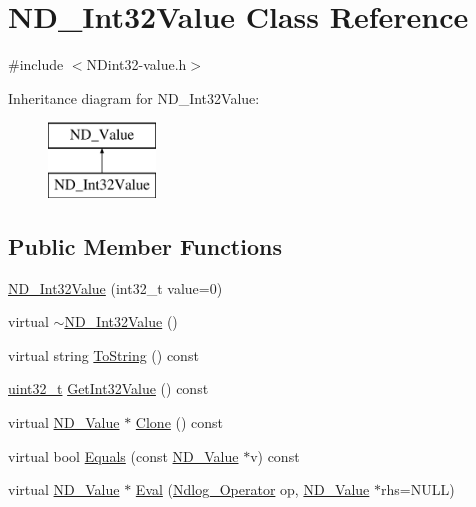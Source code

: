\hypertarget{class_n_d___int32_value}{\section{N\-D\-\_\-\-Int32\-Value Class Reference}
\label{class_n_d___int32_value}
}


{\ttfamily \#include $<$N\-Dint32-\/value.\-h$>$}

Inheritance diagram for N\-D\-\_\-\-Int32\-Value\-:\begin{figure}[H]
\begin{center}
\leavevmode
\includegraphics[height=2.000000cm]{class_n_d___int32_value}
\end{center}
\end{figure}
\subsection*{Public Member Functions}
\begin{DoxyCompactItemize}
\item 
\hyperlink{class_n_d___int32_value_aa1be1030824a1e3b2de45f15ca7e89ef}{N\-D\-\_\-\-Int32\-Value} (int32\-\_\-t value=0)
\item 
virtual \hyperlink{class_n_d___int32_value_a6a558abd1d2fd0fc446f5190ba7fc0d3}{$\sim$\-N\-D\-\_\-\-Int32\-Value} ()
\item 
virtual string \hyperlink{class_n_d___int32_value_a897c234f7b6f00843c2d9d103956b2ae}{To\-String} () const 
\item 
\hyperlink{msus_2webserver_2uthash_8h_a435d1572bf3f880d55459d9805097f62}{uint32\-\_\-t} \hyperlink{class_n_d___int32_value_a41cb60b42991e7f1ca03f732fda09aaf}{Get\-Int32\-Value} () const 
\item 
virtual \hyperlink{class_n_d___value}{N\-D\-\_\-\-Value} $\ast$ \hyperlink{class_n_d___int32_value_ae8fc6254509ce906a191e45c06f49658}{Clone} () const 
\item 
virtual bool \hyperlink{class_n_d___int32_value_af66a16bf770c3fd847d4af6c624b1860}{Equals} (const \hyperlink{class_n_d___value}{N\-D\-\_\-\-Value} $\ast$v) const 
\item 
virtual \hyperlink{class_n_d___value}{N\-D\-\_\-\-Value} $\ast$ \hyperlink{class_n_d___int32_value_a4a16725cc0cd2bc1228572c378e70847}{Eval} (\hyperlink{_n_dvalue_8h_afc938fb729c95de25b4d2eb18640b303}{Ndlog\-\_\-\-Operator} op, \hyperlink{class_n_d___value}{N\-D\-\_\-\-Value} $\ast$rhs=N\-U\-L\-L)
\end{DoxyCompactItemize}

